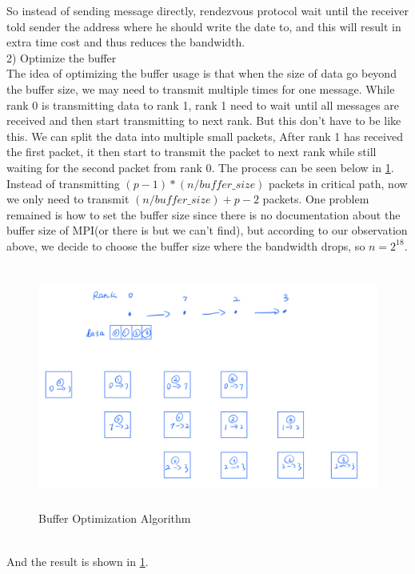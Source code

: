 \documentclass[article]{scrartcl}
\begin{document}
So instead of sending message directly, rendezvous protocol wait until the receiver told sender the address where he should write the date to,
and this will result in extra time cost and thus reduces the bandwidth.\\
2) Optimize the buffer \\
The idea of optimizing the buffer usage is that when the size of data go beyond the buffer size, we may need to transmit multiple times for one message. While rank 0 is 
transmitting data to rank 1, rank 1 need to wait until all messages are received and then start transmitting to next rank. But this don't have to be like this. We can split the data into multiple small packets,
After rank 1 has received the first packet, it then start to transmit the packet to next rank while still waiting for the second packet from rank 0. The process can be seen below in \ref{fig:buffer}.
Instead of transmitting $(p-1) * (n/buffer\_size)$ packets in critical path, now we only need to transmit $(n/buffer\_size) + p - 2$ packets. One problem remained is how to set the buffer size since 
there is no documentation about the buffer size of MPI(or there is but we can't find), but according to our observation above, we decide to choose the buffer size where the bandwidth drops, so $n = 2^{18}$. \\
\begin{figure}[htpb]
  \centering
  \includegraphics[width=\textwidth,height=8cm,keepaspectratio=true]{../figs/buffer_optimize.png}
  \caption{Buffer Optimization Algorithm}
  \label{fig:buffer}
\end{figure}
\\
And the result is shown in \ref{fig:buffer}.
\end{document}
